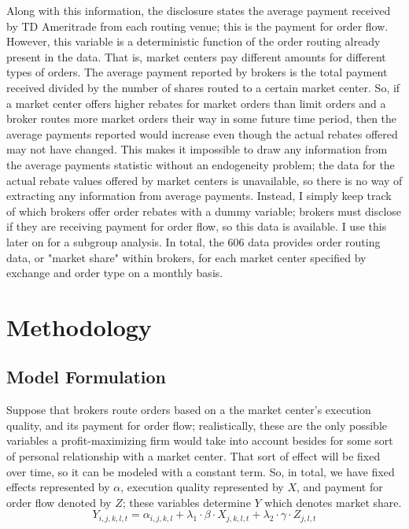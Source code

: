 \documentclass[12pt,a4paper]{article}
\begin{document}
		Along with this information, the disclosure states the average payment received by TD Ameritrade from each routing venue; this is the payment for order flow. However, this variable is a deterministic function of the order routing already present in the data. That is, market centers pay different amounts for different types of orders. The average payment reported by brokers is the total payment received divided by the number of shares routed to a certain market center. So, if a market center offers higher rebates for market orders than limit orders and a broker routes more market orders their way in some future time period, then the average payments reported would increase even though the actual rebates offered may not have changed. This makes it impossible to draw any information from the average payments statistic without an endogeneity problem; the data for the actual rebate values offered by market centers is unavailable, so there is no way of extracting any information from average payments. Instead, I simply keep track of which brokers offer order rebates with a dummy variable; brokers must disclose if they are receiving payment for order flow, so this data is available. I use this later on for a subgroup analysis. In total, the 606 data provides order routing data, or "market share" within brokers, for each market center specified by exchange and order type on a monthly basis. 
	
\pagebreak	
\section{Methodology}

	\subsection{Model Formulation}

		Suppose that brokers route orders based on a the market center's execution quality, and its payment for order flow; realistically, these are the only possible variables a profit-maximizing firm would take into account besides for some sort of personal relationship with a market center. That sort of effect will be fixed over time, so it can be modeled with a constant term. So, in total, we have fixed effects represented by $\alpha$, execution quality represented by $X$, and payment for order flow denoted by $Z$; these variables determine $Y$ which denotes market share. 
		\begin{equation}
		Y_{i, j, k, l, t} = \alpha_{i,j,k,l} + \lambda_{1} \cdot \beta \cdot X_{j, k, l, t} + \lambda_{2} \cdot \gamma \cdot Z_{j, l, t}
		\end{equation}	
		
\end{document}
